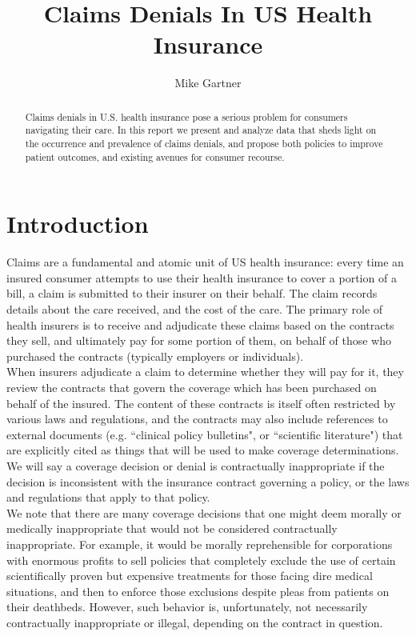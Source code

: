\documentclass[psamsfonts]{amsart}
\title{Claims Denials In US Health Insurance}
\author{Mike Gartner}
\theoremstyle{plain}
\theoremstyle{definition}
\theoremstyle{remark}
\begin{document}
	
\maketitle


\begin{abstract}
Claims denials in U.S. health insurance pose a serious problem for consumers
navigating their care. In this report we present and analyze data that sheds
light on the occurrence and prevalence of claims denials, and propose both policies
to improve patient outcomes, and existing avenues for consumer recourse.
\end{abstract}



{
	\hypersetup{linkcolor=black}
	\tableofcontents
}
	

\section{Introduction}
\label{Introduction}
Claims are a fundamental and atomic unit of US health insurance: every time an insured consumer attempts to use their health insurance to cover a portion of a bill, a claim is submitted to their insurer on their behalf. The claim records details about the care received, and the cost of the care. The primary role of health insurers is to receive and adjudicate these claims based on the contracts they sell, and ultimately pay for some portion of them, on behalf of those who purchased the contracts (typically employers or individuals).\\

When insurers adjudicate a claim to determine whether they will pay for it, they review the contracts that govern the coverage which has been purchased on behalf of the insured. The content of these contracts is itself often restricted by various laws and regulations, and the contracts may also include references to external documents (e.g. ``clinical policy bulletins", or ``scientific literature") that are explicitly cited as things that will be used to make coverage determinations. We will say a coverage decision or denial is contractually inappropriate if the decision is inconsistent with the insurance contract governing a policy, or the laws and regulations that apply to that policy.\\

We note that there are many coverage decisions that one might deem morally or medically inappropriate that would not be considered contractually inappropriate. For example, it would be morally reprehensible for corporations with enormous profits to sell policies that completely exclude the use of certain scientifically proven but expensive treatments for those facing dire medical situations, and then to enforce those exclusions despite pleas from patients on their deathbeds. However, such behavior is, unfortunately, not necessarily contractually inappropriate or illegal, depending on the contract in question.\\
\end{document}

